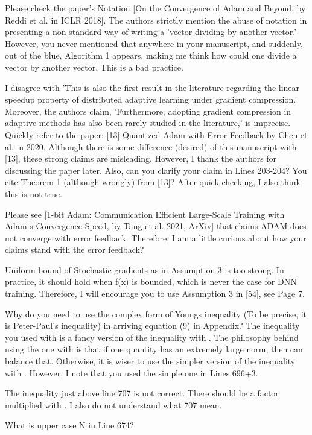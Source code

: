 \documentclass{article}
\begin{document}
Please check the paper's Notation [On the Convergence of Adam and Beyond, by Reddi et al. in ICLR 2018]. The authors strictly mention the abuse of notation in presenting a non-standard way of writing a 'vector dividing by another vector.' However, you never mentioned that anywhere in your manuscript, and suddenly, out of the blue, Algorithm 1 appears, making me think how could one divide a vector by another vector. This is a bad practice.

I disagree with 'This is also the first result in the literature regarding the linear speedup property of distributed adaptive learning under gradient compression.' Moreover, the authors claim, 'Furthermore, adopting gradient compression in adaptive methods has also been rarely studied in the literature,' is imprecise. Quickly refer to the paper: [13] Quantized Adam with Error Feedback by Chen et al. in 2020. Although there is some difference (desired) of this manuscript with [13], these strong claims are misleading. However, I thank the authors for discussing the paper later. Also, can you clarify your claim in Lines 203-204? You cite Theorem 1 (although wrongly) from [13]? After quick checking, I also think this is not true.

Please see [1-bit Adam: Communication Efficient Large-Scale Training with Adam s Convergence Speed, by Tang et al. 2021, ArXiv] that claims ADAM does not converge with error feedback. Therefore, I am a little curious about how your claims stand with the error feedback?

Uniform bound of Stochastic gradients as in Assumption 3 is too strong. In practice, it should hold when f(x) is bounded, which is never the case for DNN training. Therefore, I will encourage you to use Assumption 3 in [54], see Page 7.

Why do you need to use the complex form of Youngs inequality (To be precise, it is Peter-Paul's inequality) in arriving equation (9) in Appendix? The inequality you used with  is a fancy version of the inequality with . The philosophy behind using the one with  is that if one quantity has an extremely large norm, then  can balance that. Otherwise, it is wiser to use the simpler version of the inequality with . However, I note that you used the simple one in Lines 696+3.

The inequality just above line 707 is not correct. There should be a factor  multiplied with . I also do not understand what 707 mean.

What is upper case N in Line 674?
\end{document}
